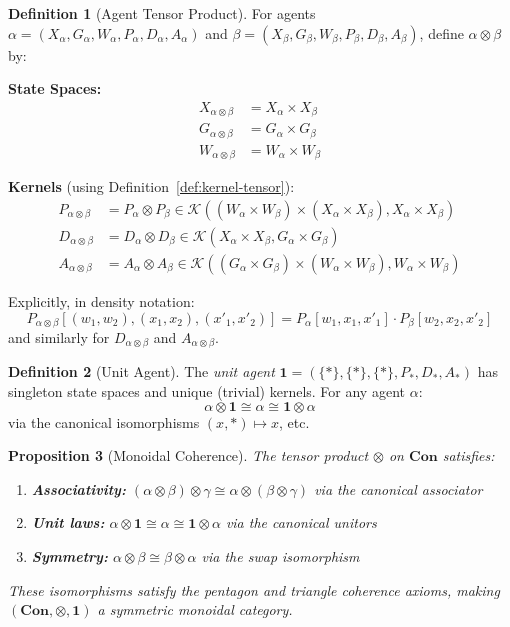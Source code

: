 \documentclass[11pt,a4paper]{article}
\theoremstyle{definition}
\newtheorem{definition}{Definition}[section]
\theoremstyle{plain}
\newtheorem{proposition}[definition]{Proposition}
\theoremstyle{remark}
\newcommand{\Con}{\mathbf{Con}}
\begin{document}
\begin{definition}[Agent Tensor Product]\label{def:tensor-product}
For agents $\alpha = (X_\alpha, G_\alpha, W_\alpha, P_\alpha, D_\alpha, A_\alpha)$ and $\beta = (X_\beta, G_\beta, W_\beta, P_\beta, D_\beta, A_\beta)$, define $\alpha \otimes \beta$ by:

\textbf{State Spaces:}
\begin{align*}
X_{\alpha \otimes \beta} &= X_\alpha \times X_\beta \\
G_{\alpha \otimes \beta} &= G_\alpha \times G_\beta \\
W_{\alpha \otimes \beta} &= W_\alpha \times W_\beta
\end{align*}

\textbf{Kernels} (using Definition~\ref{def:kernel-tensor}):
\begin{align*}
P_{\alpha \otimes \beta} &= P_\alpha \otimes P_\beta \in \mathcal{K}((W_\alpha \times W_\beta) \times (X_\alpha \times X_\beta), X_\alpha \times X_\beta) \\
D_{\alpha \otimes \beta} &= D_\alpha \otimes D_\beta \in \mathcal{K}(X_\alpha \times X_\beta, G_\alpha \times G_\beta) \\
A_{\alpha \otimes \beta} &= A_\alpha \otimes A_\beta \in \mathcal{K}((G_\alpha \times G_\beta) \times (W_\alpha \times W_\beta), W_\alpha \times W_\beta)
\end{align*}

Explicitly, in density notation:
\[
P_{\alpha \otimes \beta}[(w_1, w_2), (x_1, x_2), (x'_1, x'_2)] = P_\alpha[w_1, x_1, x'_1] \cdot P_\beta[w_2, x_2, x'_2]
\]
and similarly for $D_{\alpha \otimes \beta}$ and $A_{\alpha \otimes \beta}$.
\end{definition}

\begin{definition}[Unit Agent]\label{def:unit-agent}
The \emph{unit agent} $\mathbf{1} = (\{*\}, \{*\}, \{*\}, P_*, D_*, A_*)$ has singleton state spaces and unique (trivial) kernels. For any agent $\alpha$:
\[
\alpha \otimes \mathbf{1} \cong \alpha \cong \mathbf{1} \otimes \alpha
\]
via the canonical isomorphisms $(x, *) \mapsto x$, etc.
\end{definition}

\begin{proposition}[Monoidal Coherence]\label{prop:monoidal-coherence}
The tensor product $\otimes$ on $\Con$ satisfies:
\begin{enumerate}[label=(\roman*)]
    \item \textbf{Associativity:} $(\alpha \otimes \beta) \otimes \gamma \cong \alpha \otimes (\beta \otimes \gamma)$ via the canonical associator
    \item \textbf{Unit laws:} $\alpha \otimes \mathbf{1} \cong \alpha \cong \mathbf{1} \otimes \alpha$ via the canonical unitors
    \item \textbf{Symmetry:} $\alpha \otimes \beta \cong \beta \otimes \alpha$ via the swap isomorphism
\end{enumerate}
These isomorphisms satisfy the pentagon and triangle coherence axioms, making $(\Con, \otimes, \mathbf{1})$ a symmetric monoidal category.
\end{proposition}
\end{document}
